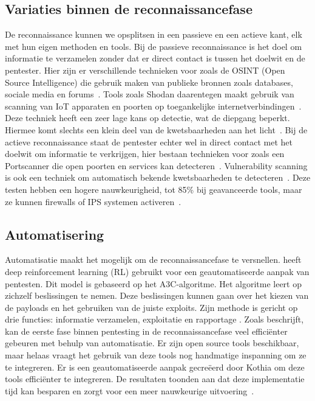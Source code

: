 \subsection{Variaties binnen de reconnaissancefase}
De reconnaissance kunnen we opsplitsen in een passieve en een actieve kant, elk met hun eigen methoden en tools. 
Bij de passieve reconnaissance is het doel om informatie te verzamelen zonder dat er direct contact is tussen het doelwit en de pentester.
Hier zijn er verschillende technieken voor zoals de OSINT (Open Source Intelligence) die gebruik maken van publieke bronnen zoals databases, sociale media en forums~\autocite{Dalalana2017}. 
Tools zoals Shodan daarentegen maakt gebruik van scanning van IoT apparaten en poorten op toegankelijke internetverbindingen~\autocite{Monero2025}.
Deze techniek heeft een zeer lage kans op detectie, wat de diepgang beperkt. Hiermee komt slechts een klein deel van de kwetsbaarheden aan het licht~\autocite{Mahin2014}.
Bij de actieve reconnaissance staat de pentester echter wel in direct contact met het doelwit om informatie te verkrijgen, hier bestaan technieken voor zoals een Portscanner die open poorten en services kan detecteren~\autocite{Mahin2014}. 
Vulnerability scanning is ook een techniek om automatisch bekende kwetsbaarheden te detecteren~\autocite{GOEL2015}. 
Deze testen hebben een hogere nauwkeurigheid, tot 85\% bij geavanceerde tools, maar ze kunnen firewalls of IPS systemen activeren~\autocite{Altulaihan2023}.

\subsection{Automatisering}
Automatisatie maakt het mogelijk om de reconnaissancefase te versnellen. 
\textcite{Hoang} heeft deep reinforcement learning (RL) gebruikt voor een geautomatiseerde aanpak van pentesten. 
Dit model is gebaseerd op het A3C-algoritme. Het algoritme leert op zichzelf beslissingen te nemen.
Deze beslissingen kunnen gaan over het kiezen van de payloads en het gebruiken van de juiste exploits. 
Zijn methode is gericht op drie functies: informatie verzamelen, exploitatie en rapportage \autocite{Hoang}.
Zoals \textcite{Kothia} beschrijft, kan de eerste fase binnen pentesting in de reconnaissancefase veel efficiënter gebeuren met behulp van automatisatie. 
Er zijn open source tools beschikbaar, maar helaas vraagt het gebruik van deze tools nog handmatige inspanning om ze te integreren.
Er is een geautomatiseerde aanpak gecreëerd door Kothia om deze tools efficiënter te integreren. 
De resultaten toonden aan dat deze implementatie tijd kan besparen en zorgt voor een meer nauwkeurige uitvoering~\autocite{Kothia}.

